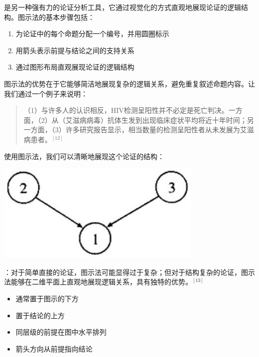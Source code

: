 是另一种强有力的论证分析工具，它通过视觉化的方式直观地展现论证的逻辑结构。图示法的基本步骤包括：

\begin{theorembox}[title=图示法的操作步骤]
\begin{enumerate}
  \item 为论证中的每个命题分配一个编号，并用圆圈标示
  \item 用箭头表示前提与结论之间的支持关系
  \item 通过图形布局直观展现论证的逻辑结构
\end{enumerate}
\end{theorembox}

图示法的优势在于它能够简洁地展现复杂的逻辑关系，避免重复叙述命题内容。让我们通过一个例子来说明：

\begin{examplebox}[title=图示法应用实例]
\begin{quotation}
（1）与许多人的认识相反，HIV检测呈阳性并不必定是死亡判决。一方面，（2）从（艾滋病病毒）抗体生发到出现临床症状平均将近十年时间；另一方面，（3）许多研究报告显示，相当数量的检测呈阳性者从未发展为艾滋病患者。${}^{[12]}$
\end{quotation}

使用图示法，我们可以清晰地展现这个论证的结构：
\end{examplebox}

\begin{center}
\includegraphics[width=\textwidth]{images/2025_05_15_6a28331d5e7c993ad07ag-030.jpg}
\end{center}

：对于简单直接的论证，图示法可能显得过于复杂；但对于结构复杂的论证，图示法能够在二维平面上直观地展现逻辑关系，具有独特的优势。${}^{[13]}$

\begin{theorembox}[title=图示法的布局原则]
\begin{itemize}
  \item {}通常置于图示的下方
  \item {}置于结论的上方
  \item 同层级的前提在图中水平排列
  \item 箭头方向从前提指向结论
\end{itemize}
\end{theorembox}


